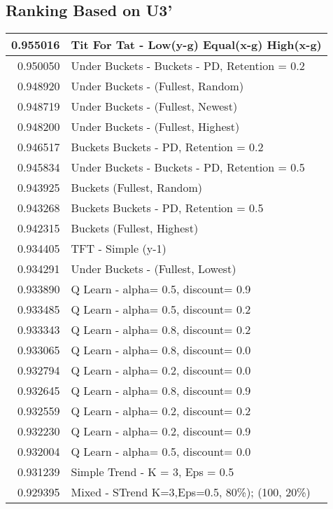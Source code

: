 \begin{table}[!hbtp]
\subsection{Ranking Based on U3'}
\begin{footnotesize}
\begin{tabular}{|r|l|}\hline  \label{U3results}
0.955016 & Tit For Tat - Low(y-g) Equal(x-g) High(x-g)\\ \hline
0.950050 & Under Buckets - Buckets - PD, Retention = 0.2\\ \hline
0.948920 & Under Buckets - (Fullest, Random)\\ \hline
0.948719 & Under Buckets - (Fullest, Newest)\\ \hline
0.948200 & Under Buckets - (Fullest, Highest)\\ \hline
0.946517 & Buckets Buckets - PD, Retention = 0.2\\ \hline
0.945834 & Under Buckets - Buckets - PD, Retention = 0.5\\ \hline
0.943925 & Buckets (Fullest, Random)\\ \hline
0.943268 & Buckets Buckets - PD, Retention = 0.5\\ \hline
0.942315 & Buckets (Fullest, Highest)\\ \hline
0.934405 & TFT - Simple (y-1)\\ \hline
0.934291 & Under Buckets - (Fullest, Lowest)\\ \hline
0.933890 & Q Learn - alpha= 0.5, discount= 0.9\\ \hline
0.933485 & Q Learn - alpha= 0.5, discount= 0.2\\ \hline
0.933343 & Q Learn - alpha= 0.8, discount= 0.2\\ \hline
0.933065 & Q Learn - alpha= 0.8, discount= 0.0\\ \hline
0.932794 & Q Learn - alpha= 0.2, discount= 0.0\\ \hline
0.932645 & Q Learn - alpha= 0.8, discount= 0.9\\ \hline
0.932559 & Q Learn - alpha= 0.2, discount= 0.2\\ \hline
0.932230 & Q Learn - alpha= 0.2, discount= 0.9\\ \hline
0.932004 & Q Learn - alpha= 0.5, discount= 0.0\\ \hline
0.931239 & Simple Trend - K = 3, Eps = 0.5\\ \hline
0.929395 & Mixed - {STrend K=3,Eps=0.5, 80\%); (100, 20\%)}\\ \hline

\end{tabular}
\end{footnotesize}
\end{table}
